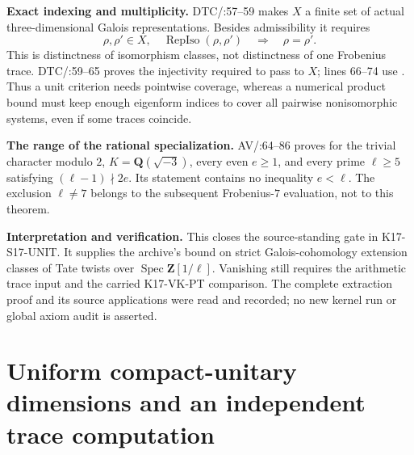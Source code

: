 \documentclass[11pt,a4paper]{article}
\theoremstyle{definition}
\renewcommand{\paragraph}[1]{\par\smallskip\noindent\textbf{#1}\quad\ignorespaces}
\begin{document}
\paragraph{Exact indexing and multiplicity.}
DTC/:57--59 makes $X$ a finite set of actual
three-dimensional Galois representations.  Besides admissibility it
requires
\[
\rho,\rho'\in X,\quad\operatorname{RepIso}(\rho,\rho')
\quad\Longrightarrow\quad\rho=\rho'.
\]
This is distinctness of isomorphism classes, not distinctness of one
Frobenius trace.  DTC/:59--65 proves the
injectivity required to pass to $X$; lines 66--74 use
.  Thus a unit criterion needs pointwise coverage,
whereas a numerical product bound must keep enough eigenform indices
to cover all pairwise nonisomorphic systems, even if some traces coincide.

\paragraph{The range of the rational specialization.}
AV/:64--86 proves
 for the trivial character modulo $2$, $K=\mathbf Q(\sqrt{-3})$,
every even $e\ge1$, and every prime $\ell\ge5$ satisfying
$(\ell-1)\nmid2e$.  Its statement contains no inequality $e<\ell$.
The exclusion $\ell\ne7$ belongs to the subsequent Frobenius-$7$
evaluation, not to this  theorem.

\paragraph{Interpretation and verification.}
This closes the source-standing gate in K17-S17-UNIT.  It supplies the
archive's bound on strict Galois-cohomology extension classes of Tate
twists over $\operatorname{Spec}\mathbf Z[1/\ell]$.
Vanishing still requires the arithmetic trace input and the carried
K17-VK-PT comparison.  The complete extraction proof and its source
applications were read and recorded; no new kernel run or global
axiom audit is asserted.



\section{Uniform compact-unitary dimensions and an independent trace computation}
\label{sec:kt-unitary}
\end{document}
